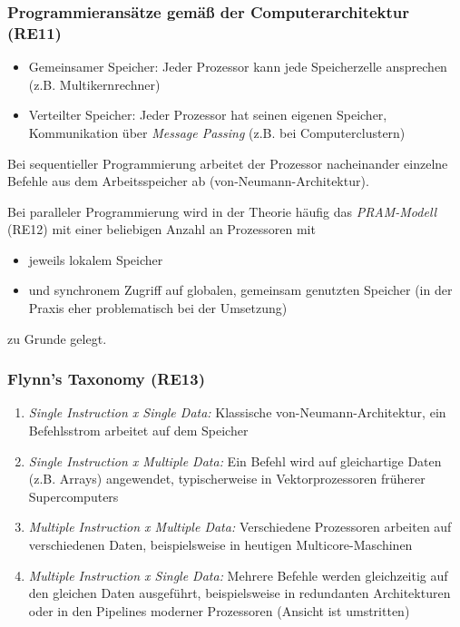 \subsubsection{Programmieransätze gemäß der Computerarchitektur (RE11)}
\begin{itemize}
	\item Gemeinsamer Speicher: Jeder Prozessor kann jede Speicherzelle ansprechen (z.B. Multikernrechner)
	\item Verteilter Speicher: Jeder Prozessor hat seinen eigenen Speicher, Kommunikation über \textit{Message Passing} (z.B. bei Computerclustern)
\end{itemize}
Bei sequentieller Programmierung arbeitet der Prozessor nacheinander einzelne Befehle aus dem Arbeitsspeicher ab (von-Neumann-Architektur).

Bei paralleler Programmierung wird in der Theorie häufig das \textit{PRAM-Modell} (RE12) mit einer beliebigen Anzahl an Prozessoren mit
\begin{itemize}
	\item jeweils lokalem Speicher
	\item und synchronem Zugriff auf globalen, gemeinsam genutzten Speicher (in der Praxis eher problematisch bei der Umsetzung)
\end{itemize}
zu Grunde gelegt.

\subsubsection{Flynn's Taxonomy (RE13)}
\begin{enumerate}
	\item \textit{Single Instruction x Single Data:} Klassische von-Neumann-Architektur, ein Befehlsstrom arbeitet auf dem Speicher
	\item \textit{Single Instruction x Multiple Data:} Ein Befehl wird auf gleichartige Daten (z.B. Arrays) angewendet, typischerweise in Vektorprozessoren früherer Supercomputers
	\item \textit{Multiple Instruction x Multiple Data:} Verschiedene Prozessoren arbeiten auf verschiedenen Daten, beispielsweise in heutigen Multicore-Maschinen
	\item \textit{Multiple Instruction x Single Data:} Mehrere Befehle werden gleichzeitig auf den gleichen Daten ausgeführt, beispielsweise in redundanten Architekturen oder in den Pipelines moderner Prozessoren (Ansicht ist umstritten)
\end{enumerate}

